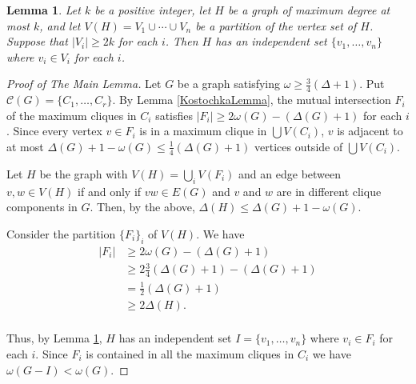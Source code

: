 \documentclass[12pt]{article}
\theoremstyle{plain}
\newtheorem{lem}[thm]{Lemma}
\theoremstyle{definition}
\theoremstyle{remark}
\begin{document}
\begin{lem}\label{HaxellLemma}
Let $k$ be a positive integer, let $H$ be a graph of maximum degree at most $k$,
and let $V(H) = V_1 \cup \cdots \cup V_n$ be a partition of the vertex set of $H$. Suppose that $|V_i| \geq 2k$ for each $i$. Then $H$ has an independent set $\{v_1, \ldots, v_n\}$ where $v_i \in V_i$ for each $i$.
\end{lem}

\begin{proof}[Proof of The Main Lemma]
Let $G$ be a graph satisfying $\omega \geq \frac{3}{4}(\Delta + 1)$.  Put $\mathcal{C}(G) = \{C_1, \ldots, C_r\}$. By Lemma \ref{KostochkaLemma}, the mutual intersection $F_i$ of the maximum cliques in $C_i$ satisfies $|F_i| \geq 2\omega(G) - (\Delta(G) + 1)$ for each $i$.  Since every vertex $v \in F_i$ is in a maximum clique in $\bigcup V(C_i)$, $v$ is adjacent to at most $\Delta(G) + 1 - \omega(G) \leq \frac{1}{4} (\Delta(G) + 1)$ vertices outside of $\bigcup V(C_i)$.\newline

Let $H$ be the graph with $V(H) = \displaystyle \bigcup_{i} V(F_i)$ and an edge between $v, w \in V(H)$ if and only if $vw \in E(G)$ and $v$ and $w$ are in different clique components in $G$.  Then, by the above, $\Delta(H) \leq \Delta(G) + 1 - \omega(G)$.\newline

Consider the partition $\{F_i\}_{i}$ of $V(H)$.  We have 
\begin{align*}
|F_i| &\geq 2\omega(G) - (\Delta(G) + 1) \\
&\geq 2 \frac{3}{4}(\Delta(G) + 1) - (\Delta(G) + 1) \\
&= \frac{1}{2}(\Delta(G) + 1) \\
&\geq 2\Delta(H). \\
\end{align*}

Thus, by Lemma \ref{HaxellLemma}, $H$ has an independent set $I = \{v_1, \ldots, v_n\}$ where $v_i \in F_i$ for each $i$.  Since $F_i$ is contained in all the maximum cliques in $C_i$ we have $\omega(G - I) < \omega(G)$.
\end{proof}
\end{document}
